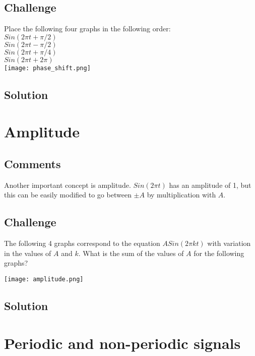 \subsection*{Challenge}
Place the following four graphs in the following order:\\
$Sin(2 \pi t + \pi/2)$\\
$Sin(2 \pi t - \pi/2)$\\
$Sin(2 \pi t + \pi/4)$\\
$Sin(2 \pi t + 2 \pi)$\\

\texttt{[image: phase\_shift.png]}

\subsection*{Solution}



\newpage
\section{Amplitude}

\subsection*{Comments}
Another important concept is amplitude. $Sin(2 \pi t)$ has an amplitude of 1, but this can be easily modified to go between $\pm A$ by multiplication with $A$.

\subsection*{Challenge}
The following 4 graphs correspond to the equation $A Sin(2 \pi k t)$ with variation in the values of $A$ and $k$. What is the sum of the values of $A$ for the following graphs? 

\texttt{[image: amplitude.png]}

\subsection*{Solution}




\newpage
\section{Periodic and non-periodic signals}
\label{sec:periodic}

